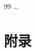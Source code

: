 \documentclass[12pt,a4paper]{article}
\begin{document}

\newpage
\begin{thebibliography}{99}
 ...
\end{thebibliography}

\newpage
\section*{附录}
\end{document}
